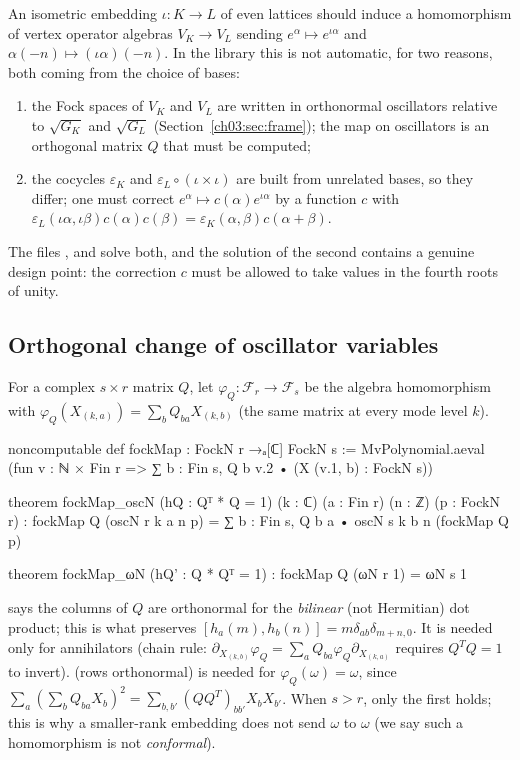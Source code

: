 An isometric embedding $\iota\colon K\to L$ of even lattices should induce a homomorphism of
vertex operator algebras $V_K\to V_L$ sending $e^\alpha\mapsto e^{\iota\alpha}$ and
$\alpha(-n)\mapsto(\iota\alpha)(-n)$. In the library this is not automatic, for two reasons, both
coming from the choice of bases:
\begin{enumerate}
\item the Fock spaces of $V_K$ and $V_L$ are written in orthonormal oscillators relative to
  $\sqrt{G_K}$ and $\sqrt{G_L}$ (Section~\ref{ch03:sec:frame}); the map on oscillators is an
  orthogonal matrix $Q$ that must be computed;
\item the cocycles $\varepsilon_K$ and $\varepsilon_L\circ(\iota\times\iota)$ are built from
  unrelated bases, so they differ; one must correct $e^\alpha\mapsto c(\alpha)e^{\iota\alpha}$ by a
  function $c$ with $\varepsilon_L(\iota\alpha,\iota\beta)c(\alpha)c(\beta)=\varepsilon_K(\alpha,
  \beta)c(\alpha+\beta)$.
\end{enumerate}
The files ,  and
 solve both, and the solution of the second contains a genuine
design point: the correction $c$ must be allowed to take values in the fourth roots of unity.

\subsection{Orthogonal change of oscillator variables}

\begin{definition}\label{ch03:def:fockMap}
For a complex $s\times r$ matrix $Q$, let $\varphi_Q\colon\mathcal F_r\to\mathcal F_s$ be the
algebra homomorphism with $\varphi_Q(X_{(k,a)})=\sum_bQ_{ba}X_{(k,b)}$ (the same matrix at every
mode level $k$).
\end{definition}
\begin{leancode}
noncomputable def fockMap : FockN r →ₐ[ℂ] FockN s :=
  MvPolynomial.aeval (fun v : ℕ × Fin r => ∑ b : Fin s, Q b v.2 • (X (v.1, b) : FockN s))

theorem fockMap_oscN (hQ : Qᵀ * Q = 1) (k : ℂ) (a : Fin r) (n : ℤ) (p : FockN r) :
    fockMap Q (oscN r k a n p) = ∑ b : Fin s, Q b a • oscN s k b n (fockMap Q p)

theorem fockMap_ωN (hQ' : Q * Qᵀ = 1) : fockMap Q (ωN r 1) = ωN s 1
\end{leancode}
\begin{dictionary}
 says the columns of $Q$ are orthonormal for the \emph{bilinear} (not Hermitian)
dot product; this is what preserves $[h_a(m),h_b(n)]=m\delta_{ab}\delta_{m+n,0}$. It is needed only
for annihilators (chain rule: $\partial_{X_{(k,b)}}\varphi_Q=\sum_aQ_{ba}\varphi_Q\partial_{X_{(k,a)}}$
requires $Q^TQ=1$ to invert).  (rows orthonormal) is needed for
$\varphi_Q(\omega)=\omega$, since $\sum_a(\sum_bQ_{ba}X_b)^2=\sum_{b,b'}(QQ^T)_{bb'}X_bX_{b'}$.
When $s>r$, only the first holds; this is why a smaller-rank embedding does not send $\omega$ to
$\omega$ (we say such a homomorphism is not \emph{conformal}).
\end{dictionary}

